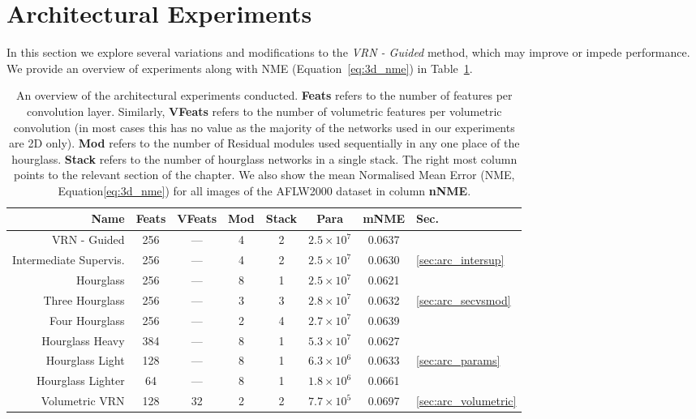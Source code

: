 \section{Architectural Experiments}
\label{sec:arcexp}

In this section we explore several variations and modifications to the
\textit{VRN - Guided} method, which may improve or impede
performance. We provide an overview of experiments along with NME
(Equation~\ref{eq:3d_nme}) in Table~\ref{tab:arcexpoverview}.

\begin{table}
  \caption[Overview of architectural experiments]{An overview of the
    architectural experiments conducted. \textbf{Feats} refers to the
    number of features per convolution layer. Similarly,
    \textbf{VFeats} refers to the number of volumetric features per
    volumetric convolution (in most cases this has no value as the
    majority of the networks used in our experiments are 2D
    only). \textbf{Mod} refers to the number of Residual modules used
    sequentially in any one place of the hourglass. \textbf{Stack}
    refers to the number of hourglass networks in a single stack. The
    right most column points to the relevant section of the
    chapter. We also show the mean Normalised Mean Error (NME,
    Equation\ref{eq:3d_nme}) for all images of the AFLW2000 dataset in
    column \textbf{nNME}.}
  \label{tab:arcexpoverview}
  \centering
  \small
  \begin{tabular}{|r|| c|c|c|c || c || c|l|}
    \hline
    \textbf{Name} & \textbf{Feats} & \textbf{VFeats} & \textbf{Mod} & \textbf{Stack} &  \textbf{Para} & \textbf{mNME} & \textbf{Sec.} \\
    \hline\hline
    VRN - Guided             & 256    & ---     & 4        & 2  & $2.5\times 10^7$    & 0.0637 &   \\
    \hline
    Intermediate Supervis.   & 256    & ---     & 4        & 2  & $2.5\times 10^7$    & 0.0630 & \ref{sec:arc_intersup}  \\
    \hline
    Hourglass                & 256    & ---     & 8        & 1  & $2.5\times 10^7$    & 0.0621 &   \\
    Three Hourglass          & 256    & ---     & 3        & 3  & $2.8\times 10^7$    & 0.0632 & \ref{sec:arc_secvsmod}  \\
    Four Hourglass           & 256    & ---     & 2        & 4  & $2.7\times 10^7$    & 0.0639 &   \\
    \hline
    Hourglass Heavy          & 384    & ---     & 8        & 1  & $5.3\times 10^7$    & 0.0627 &   \\
    Hourglass Light          & 128    & ---     & 8        & 1  & $6.3\times 10^6$    & 0.0633 & \ref{sec:arc_params}  \\
    Hourglass Lighter        & 64     & ---     & 8        & 1  & $1.8\times 10^6$    & 0.0661 &   \\
    \hline
    Volumetric VRN           & 128    & 32      & 2        & 2  & $7.7\times 10^5$    & 0.0697 & \ref{sec:arc_volumetric} \\
    \hline
  \end{tabular}
\end{table}


